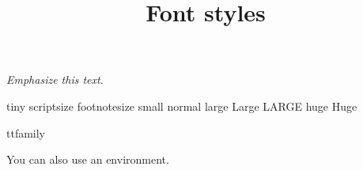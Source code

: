 \documentclass{article}
\title{Font styles}
\begin{document}
\maketitle

\emph{Emphasize this text}.

\bigskip

{\tiny tiny} {\scriptsize scriptsize}
{\footnotesize footnotesize} {\small small}
{\normalsize normal} {\large large}
{\Large Large} {\LARGE LARGE}
{\huge huge} {\Huge Huge}

\bigskip

{\ttfamily ttfamily}

\bigskip

\begin{ttfamily}
You can also use an environment.
\end{ttfamily}
\end{document}
